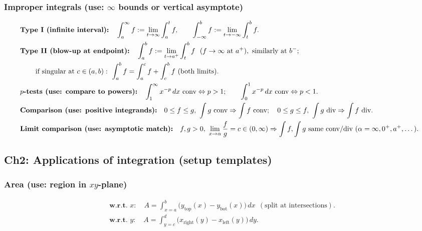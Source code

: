 \documentclass[12pt]{article}
\begin{document}
\subsubsection{Improper integrals (use: $\infty$ bounds or vertical asymptote)}
\begin{align*}
&\textbf{Type I (infinite interval):}\quad \int_a^{\infty} f:=\lim_{t\to\infty}\int_a^t f,\qquad
\int_{-\infty}^{b} f:=\lim_{t\to-\infty}\int_t^b f.\\
&\textbf{Type II (blow-up at endpoint):}\quad
\int_a^b f:=\lim_{t\to a^+}\int_t^b f\ \ (f\to\infty \text{ at }a^+),\ \text{similarly at }b^-;\\
&\hspace{2.2em}\text{if singular at }c\in(a,b):\ \int_a^b f=\int_a^c f+\int_c^b f\ (\text{both limits}).\\
&\textbf{$p$-tests (use: compare to powers):}\quad
\int_1^{\infty} x^{-p}\,dx\ \text{conv}\Leftrightarrow p>1;\qquad
\int_0^{1} x^{-p}\,dx\ \text{conv}\Leftrightarrow p<1.\\
&\textbf{Comparison (use: positive integrands):}\quad
0\le f\le g,\ \int g\ \text{conv}\Rightarrow\int f\ \text{conv};\quad
0\le g\le f,\ \int g\ \text{div}\Rightarrow\int f\ \text{div}.\\
&\textbf{Limit comparison (use: asymptotic match):}\quad
f,g>0,\ \lim_{x\to\alpha}\frac{f}{g}=c\in(0,\infty)\Rightarrow \int f,\int g\ \text{same conv/div}
\ (\alpha=\infty,0^+,a^+,\dots).
\end{align*}

\subsection{Ch2: Applications of integration (setup templates)}
\subsubsection{Area (use: region in $xy$-plane)}
\begin{align*}
&\textbf{w.r.t. }x:\quad A=\int_{x=a}^{b}\big(y_{\text{top}}(x)-y_{\text{bot}}(x)\big)\,dx\ \ (\text{split at intersections}).\\
&\textbf{w.r.t. }y:\quad A=\int_{y=c}^{d}\big(x_{\text{right}}(y)-x_{\text{left}}(y)\big)\,dy.
\end{align*}
\end{document}
